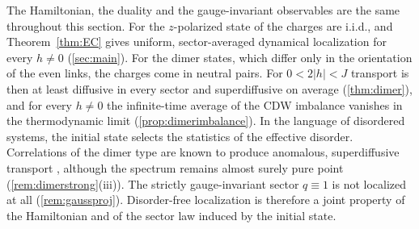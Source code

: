 \begin{remark}\label{rem:dimermessage}
The Hamiltonian, the duality and the gauge-invariant observables are the same throughout this section.
For the $z$-polarized state of \cite{SKKM2017} the charges are i.i.d., and
Theorem~\ref{thm:EC} gives uniform, sector-averaged dynamical localization for every $h\neq0$
(\cref{sec:main}).  For the dimer states, which differ only in the orientation of the even links,
the charges come in neutral pairs.  For $0<2|h|<J$ transport is then at least diffusive in every
sector and superdiffusive on average (\cref{thm:dimer}), and for every $h\neq0$ the infinite-time
average of the CDW imbalance vanishes in the thermodynamic limit (\cref{prop:dimerimbalance}).  In the language of disordered systems, the initial state
selects the statistics of the effective disorder.  Correlations of the dimer type are known to produce
anomalous, superdiffusive transport \cite{DWP1990,JSBS2003}, although the spectrum remains almost surely
pure point \cite{DeBievreGerminet2000} (\cref{rem:dimerstrong}(iii)).  The strictly gauge-invariant sector $q\equiv1$ is not
localized at all (\cref{rem:gaussproj}).  Disorder-free localization is
therefore a joint property of the Hamiltonian and of the sector law induced by the initial state.
\end{remark}
